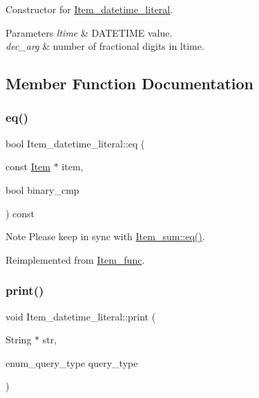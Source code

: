 Constructor for \mbox{\hyperlink{classItem__datetime__literal}{Item\+\_\+datetime\+\_\+literal}}. 
\begin{DoxyParams}{Parameters}
{\em ltime} & D\+A\+T\+E\+T\+I\+ME value. \\
\hline
{\em dec\+\_\+arg} & number of fractional digits in ltime. \\
\hline
\end{DoxyParams}


\subsection{Member Function Documentation}
\mbox{\label{classItem__datetime__literal_a30ee1698b8a594542f2017e3ee6ac8ad}} 
\subsubsection{\texorpdfstring{eq()}{eq()}}
{\footnotesize\ttfamily bool Item\+\_\+datetime\+\_\+literal\+::eq (\begin{DoxyParamCaption}\item[{const \mbox{\hyperlink{classItem}{Item}} $\ast$}]{item,  }\item[{bool}]{binary\+\_\+cmp }\end{DoxyParamCaption}) const\hspace{0.3cm}{\ttfamily [virtual]}}

\begin{DoxyNote}{Note}
Please keep in sync with \mbox{\hyperlink{classItem__sum_aeab749252b834e0be4f00aac8ca523f5}{Item\+\_\+sum\+::eq()}}. 
\end{DoxyNote}


Reimplemented from \mbox{\hyperlink{classItem__func_a3de3f23377e6f0006dfccd375086365f}{Item\+\_\+func}}.

\mbox{\label{classItem__datetime__literal_a96ac54156ec3267f4913e3fbed7837a1}} 
\subsubsection{\texorpdfstring{print()}{print()}}
{\footnotesize\ttfamily void Item\+\_\+datetime\+\_\+literal\+::print (\begin{DoxyParamCaption}\item[{String $\ast$}]{str,  }\item[{enum\+\_\+query\+\_\+type}]{query\+\_\+type }\end{DoxyParamCaption})\hspace{0.3cm}{\ttfamily [virtual]}}

